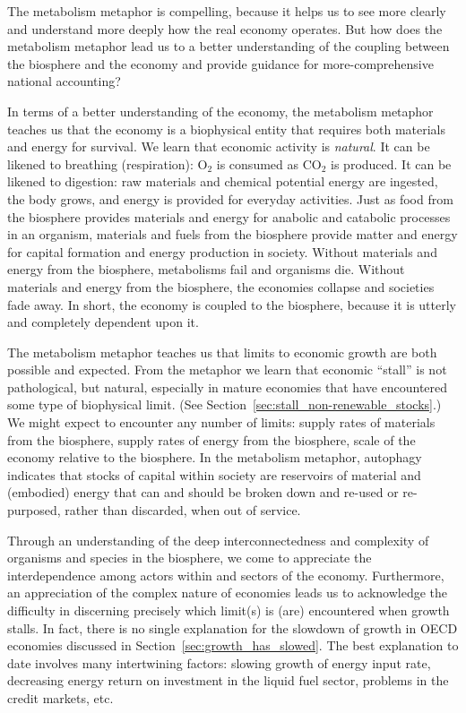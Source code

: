 The metabolism metaphor is compelling, 
because it helps us to see more clearly
and understand more deeply
how the real economy operates.
But how does the metabolism metaphor lead us to a better understanding 
of the coupling between the biosphere and the economy 
and provide guidance for more-comprehensive national accounting?

In terms of a better understanding of the economy, 
the metabolism metaphor teaches us that the economy is a biophysical entity
that requires both materials and energy for survival.
We learn that economic activity is \emph{natural}.
It can be likened to breathing (respiration): 
O$_2$ is consumed as CO$_2$ is produced.
It can be likened to digestion:
raw materials and chemical potential energy are ingested, 
the body grows, 
and energy is provided for everyday activities.
Just as food from the biosphere provides materials and energy for
anabolic and catabolic processes in an organism, 
materials and fuels from the biosphere provide matter and energy for
capital formation and energy production in society.
Without materials and energy from the biosphere, 
metabolisms fail and organisms die. 
Without materials and energy from the biosphere,
the economies collapse and societies fade away.
In short, the economy is coupled to the biosphere,
because it is utterly and completely dependent upon it.

The metabolism metaphor teaches us that limits to economic growth
are both possible and expected.
From the metaphor we learn that economic ``stall'' is not pathological, 
but natural, especially in mature economies 
that have encountered some type of biophysical limit.
(See Section~\ref{sec:stall_non-renewable_stocks}.)
We might expect to encounter any number of limits:
supply rates of materials from the biosphere,
supply rates of energy from the biosphere,
scale of the economy relative to the biosphere.
In the metabolism metaphor, autophagy indicates that stocks 
of capital within society are reservoirs of 
material and (embodied) energy that can and should be 
broken down and re-used or re-purposed,
rather than discarded, 
when out of service.

Through an understanding of the deep interconnectedness and complexity
of organisms and species in the biosphere, 
we come to appreciate the interdependence 
among actors within and sectors of the economy.
Furthermore, an appreciation of the complex nature of economies leads us 
to acknowledge the difficulty in discerning
precisely which limit(s) is (are) encountered when growth stalls.
In fact, there is no single explanation 
for the slowdown of growth in OECD economies 
discussed in Section~\ref{sec:growth_has_slowed}.
The best explanation to date involves many intertwining factors: 
slowing growth of energy input rate, 
decreasing energy return on investment in the liquid fuel sector,
problems in the credit markets, etc.

